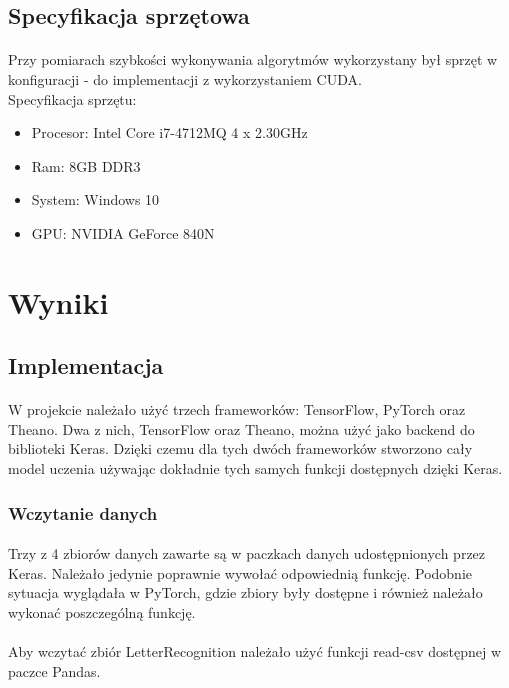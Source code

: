 \documentclass[a4paper,11pt]{article}
\begin{document}
\subsection{Specyfikacja sprzętowa}
\paragraph{}Przy pomiarach szybkości wykonywania algorytmów wykorzystany był sprzęt w konfiguracji 
- do implementacji z wykorzystaniem CUDA.
\\Specyfikacja sprzętu:
\begin{itemize}
\item Procesor: Intel Core i7-4712MQ 4 x 2.30GHz
\item Ram: 8GB DDR3
\item System: Windows 10
\item GPU: NVIDIA GeForce 840N
\
\end{itemize}
\section{Wyniki}
\subsection{Implementacja} 
\paragraph{}W projekcie należało użyć trzech frameworków: TensorFlow, PyTorch oraz Theano. Dwa z nich, TensorFlow oraz Theano, można użyć jako backend do biblioteki Keras. Dzięki czemu dla tych dwóch frameworków stworzono cały model uczenia używając dokładnie tych samych funkcji dostępnych dzięki Keras. 
\subsubsection{Wczytanie danych}
\paragraph{}Trzy z 4 zbiorów danych zawarte są w paczkach danych udostępnionych przez Keras. Należało jedynie poprawnie wywołać odpowiednią funkcję. Podobnie sytuacja wyglądała w PyTorch, gdzie zbiory były dostępne i również należało wykonać poszczególną funkcję.
\paragraph{}Aby wczytać zbiór LetterRecognition należało użyć funkcji read-csv dostępnej w paczce Pandas. 
\end{document}
